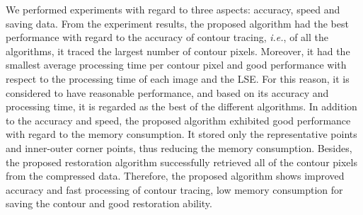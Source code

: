 \documentclass[sensors,article,accept,moreauthors,pdftex,10pt,a4paper]{mdpi}
\begin{document}
We performed experiments with regard to three aspects: accuracy, speed and saving data. From the experiment results, the proposed algorithm had the best performance with regard to the accuracy of contour tracing, \emph{i.e.}, of all the algorithms, it traced the largest number of contour pixels. Moreover, it had the smallest average processing time per contour pixel and good performance with respect to the processing time of each image and the LSE. For this reason, it is considered to have reasonable performance, and based on its accuracy and processing time, it is regarded as the best of the different algorithms. In addition to the accuracy and speed, the proposed algorithm exhibited good performance with regard to the memory consumption. It stored only the representative points and inner-outer corner points, thus reducing the memory consumption. Besides, the proposed restoration algorithm successfully retrieved all of the contour pixels from the compressed data. Therefore, the proposed algorithm shows improved accuracy and fast processing of contour tracing, low memory consumption for saving the contour and good restoration ability.

\vspace{6pt} 




\end{document}
